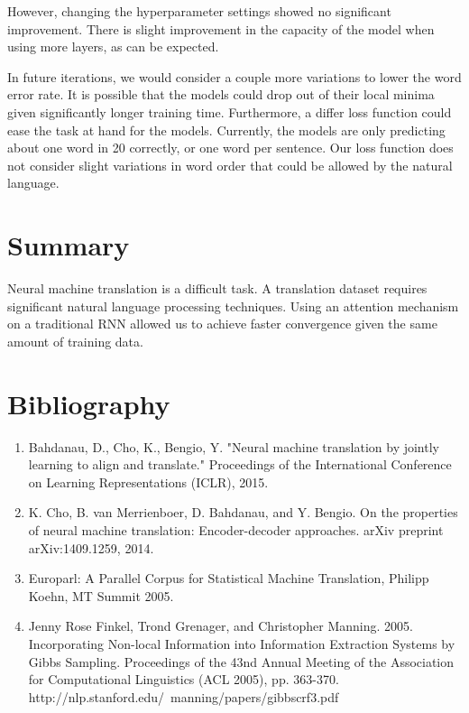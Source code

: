\documentclass[letterpaper, 10pt]{article}
\begin{document}
\begin{multicols}{2}
\noindent However, changing the hyperparameter settings showed no significant improvement.
There is slight improvement in the capacity of the model when using more layers, as can be expected.

In future iterations, we would consider a couple more variations to lower the word error rate.
It is possible that the models could drop out of their local minima given significantly longer
training time.
Furthermore, a differ loss function could ease the task at hand for the models.
Currently, the models are only predicting about one word in 20 correctly, or one word per sentence.
Our loss function does not consider slight variations in word order that could be allowed by the
natural language.

\section{Summary}
Neural machine translation is a difficult task.
A translation dataset requires significant natural language processing techniques.
Using an attention mechanism on a traditional RNN allowed us to achieve faster convergence given
the same amount of training data.

\section{Bibliography}
\begin{enumerate}
\item Bahdanau, D., Cho, K., Bengio, Y. "Neural machine translation by jointly learning to align and translate." Proceedings of the International Conference on Learning Representations (ICLR), 2015.

\item K. Cho, B. van Merrienboer, D. Bahdanau, and Y. Bengio. On the properties of neural machine translation: Encoder-decoder approaches. arXiv preprint arXiv:1409.1259, 2014.

\item Europarl: A Parallel Corpus for Statistical Machine Translation, Philipp Koehn, MT Summit 2005.

\item Jenny Rose Finkel, Trond Grenager, and Christopher Manning. 2005. Incorporating Non-local Information into Information Extraction Systems by Gibbs Sampling. Proceedings of the 43nd Annual Meeting of the Association for Computational Linguistics (ACL 2005), pp. 363-370. http://nlp.stanford.edu/~manning/papers/gibbscrf3.pdf
\end{enumerate}

\end{multicols}
\end{document}
